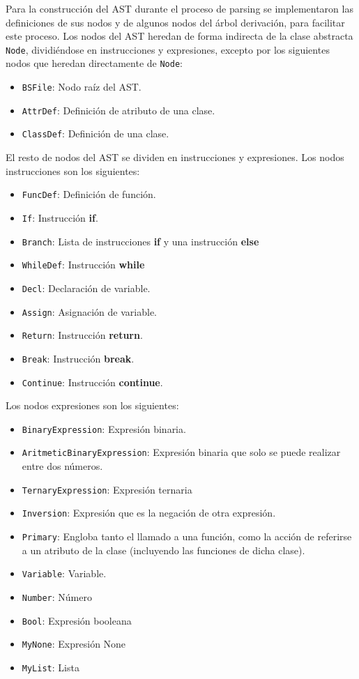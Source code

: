 Para la construcci\'on del AST durante el proceso de parsing se implementaron las definiciones de sus nodos y de algunos nodos del \'arbol derivaci\'on, para facilitar este proceso. Los nodos del AST heredan de forma indirecta de la clase abstracta \verb|Node|, dividi\'endose en instrucciones y expresiones, excepto por los siguientes nodos que heredan directamente de \verb|Node|:

\begin{itemize}
	\item \verb|BSFile|: Nodo ra\'iz del AST.
	\item \verb |AttrDef|: Definici\'on de atributo de una clase.  
	\item \verb|ClassDef|: Definici\'on de una clase.
\end{itemize}

El resto de nodos del AST se dividen en instrucciones y expresiones. Los nodos instrucciones son los siguientes:

\begin{itemize}
	\item \verb|FuncDef|: Definici\'on de funci\'on.
	\item \verb|If|: Instrucci\'on \textbf{if}. 
	\item \verb|Branch|: Lista de instrucciones \textbf{if} y una instrucci\'on \textbf{else}
	\item \verb|WhileDef|: Instrucci\'on \textbf{while}
	\item \verb|Decl|: Declaraci\'on de variable.
	\item \verb|Assign|: Asignaci\'on de variable. 
	\item \verb|Return|: Instrucci\'on \textbf{return}.
	\item \verb|Break|: Instrucci\'on \textbf{break}.
	\item \verb|Continue|: Instrucci\'on \textbf{continue}.
\end{itemize}

Los nodos expresiones son los siguientes:

\begin{itemize}
	\item \verb|BinaryExpression|: Expresi\'on binaria.
	\item \verb|AritmeticBinaryExpression|: Expresi\'on binaria que solo se puede realizar entre dos n\'umeros.
	\item \verb|TernaryExpression|: Expresi\'on ternaria
	\item \verb|Inversion|: Expresi\'on que es la negaci\'on de otra expresi\'on.
	\item \verb|Primary|: Engloba tanto el llamado a una funci\'on, como la acci\'on de referirse a un atributo de la clase (incluyendo las funciones de dicha clase).
	\item \verb|Variable|: Variable.
	\item \verb|Number|: N\'umero
	\item \verb|Bool|: Expresi\'on booleana
	\item \verb|MyNone|: Expresi\'on None
	\item \verb|MyList|: Lista
\end{itemize}

